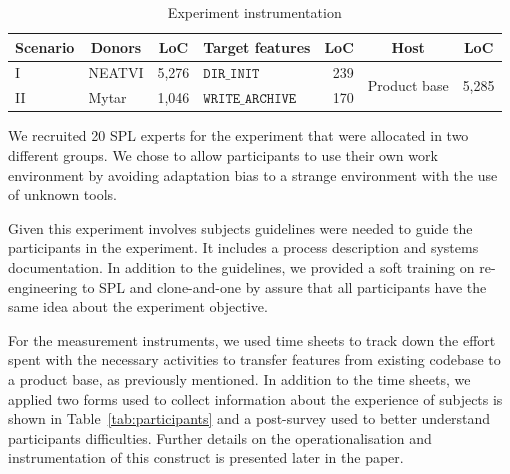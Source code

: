 \begin{table}[t]
	\caption{Experiment instrumentation}
	\label{tab:instrumentation}
    \begin{adjustbox}{width=\columnwidth,center}
    	\begin{tabular}{l|lr|lr|lr} \hline
    		\multicolumn{1}{c}{Scenario} & \multicolumn{1}{|c}{Donors} & \multicolumn{1}{c|}{LoC}   & \multicolumn{1}{c}{Target features}       & \multicolumn{1}{c|}{LoC}  & \multicolumn{1}{c}{Host}& \multicolumn{1}{c}{LoC} \\\hline
    		I       & NEATVI & 5,276 & $\texttt{DIR\_INIT}$  & 239&\multirow{2}{*}{Product base}&\multirow{2}{*}{5,285} \\
    		II      & Mytar  & 1,046 & $\texttt{WRITE\_ARCHIVE}$ & 170&& \\\hline
    	\end{tabular}
    \end{adjustbox}
\end{table}

We recruited 20 SPL experts for the experiment that were allocated in two different groups.  We chose to allow participants to use their own work environment by avoiding adaptation bias to a strange environment with the use of unknown tools.



Given this experiment involves subjects guidelines were needed to guide the participants in the experiment. It includes a process description and systems documentation. In addition to the guidelines, we provided a soft training on re-engineering to SPL and clone-and-one by assure that all participants have the same idea about the experiment objective.

For the measurement instruments, we used time sheets to track down the effort spent with the necessary activities to transfer features from existing codebase to a product base, as previously mentioned. In addition to the time sheets, we applied two forms used to collect information about the experience of subjects is shown in Table~\ref{tab:participants} and a post-survey used to better understand participants difficulties.  Further details on the operationalisation and instrumentation of this construct is presented later in the paper. 

